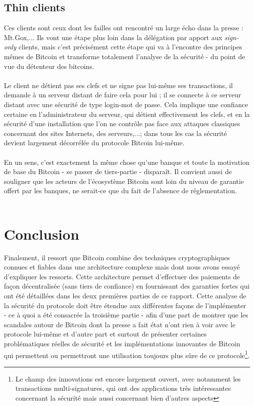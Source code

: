\documentclass[11pt,a4paper]{article}
\begin{document}
\subsection{Thin clients}
Ces clients sont ceux dont les failles ont rencontré un large écho dans la presse : Mt.Gox,... Ils vont une étape plus loin dans la délégation par apport aux \textit{sign-only} clients, mais c'est précisément cette étape qui va à l'encontre des principes mêmes de Bitcoin et transforme totalement l'analyse de la sécurité - du point de vue du détenteur des bitcoins.\\\\
Le client ne détient pas ses clefs et ne signe pas lui-même ses transactions, il demande à un serveur distant de faire cela pour lui ; il se connecte à ce serveur distant avec une sécurité de type login-mot de passe. Cela implique une confiance certaine en l'administrateur du serveur, qui détient effectivement les clefs, et en la sécurité d'une installation que l'on ne contrôle pas face aux attaques classiques concernant des sites Internets, des serveurs,...; dans tous les cas la sécurité devient largement décorrélée du protocole Bitcoin lui-même.\\\\ En un sens, c'est exactement la même chose qu'une banque et toute la motivation de base du Bitcoin - se passer de tiers-partie - disparaît. Il convient aussi de souligner que les acteurs de l'écosystème Bitcoin sont loin du niveau de garantie offert par les banques, ne serait-ce que du fait de l'absence de réglementation.
\\\\
\section*{Conclusion}
Finalement, il ressort que Bitcoin combine des techniques cryptographiques connues et fiables dans une architecture complexe mais dont nous avons essayé d'expliquer les ressorts. Cette architecture permet d'effectuer des paiements de façon décentralisée (sans tiers de confiance) en fournissant des garanties fortes qui ont été détaillées dans les deux premières parties de ce rapport. Cette analyse de la sécurité du protocole doit être étendue aux différentes façons de l'implémenter - ce à quoi a été consacrée la troisième partie - afin d'une part de montrer que les scandales autour de Bitcoin dont la presse a fait état n'ont rien à voir avec le protocole lui-même et d'autre part et surtout de présenter certaines problématiques réelles de sécurité et les implémentations innovantes de Bitcoin qui permettent ou permettront une utilisation toujours plus sûre de ce protocole\footnote{Le champ des innovations est encore largement ouvert, avec notamment les transactions multi-signatures, qui ont des applications très intéressantes concernant la sécurité mais aussi concernant bien d'autres aspects}. 
{}

\end{document}

